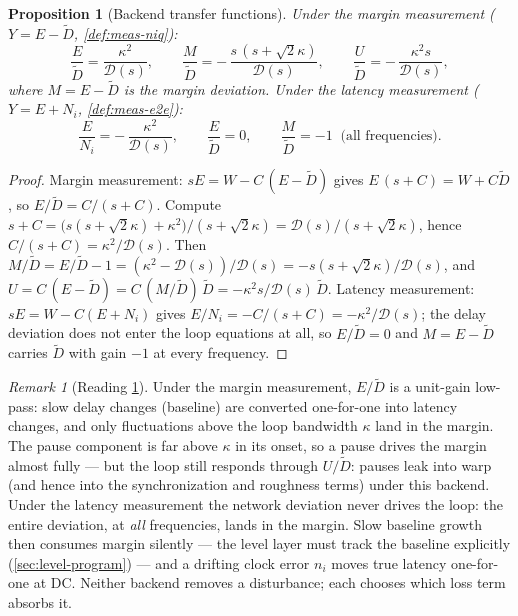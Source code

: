 \documentclass[11pt, a4paper]{article}
\theoremstyle{definition}
\theoremstyle{plain}
\newtheorem{proposition}[theorem]{Proposition}
\theoremstyle{remark}
\newtheorem{remark}{Remark}[section]
\begin{document}
\begin{proposition}[Backend transfer functions]\label{prop:transfer}
Under the margin measurement ($Y = E - \tilde D$, \cref{def:meas-niq}):
\begin{equation}\label{eq:tf-niq}
  \frac{E}{\tilde D} = \frac{\kappa^2}{\mathcal{D}(s)},
  \qquad
  \frac{M}{\tilde D} = -\,\frac{s\,(s+\sqrt2\kappa)}{\mathcal{D}(s)},
  \qquad
  \frac{U}{\tilde D} = -\,\frac{\kappa^2 s}{\mathcal{D}(s)},
\end{equation}
where $M = E - \tilde D$ is the margin deviation.  Under the latency
measurement ($Y = E + N_i$, \cref{def:meas-e2e}):
\begin{equation}\label{eq:tf-e2e}
  \frac{E}{N_i} = -\,\frac{\kappa^2}{\mathcal{D}(s)},
  \qquad
  \frac{E}{\tilde D} = 0,
  \qquad
  \frac{M}{\tilde D} = -1 \;\;\text{(all frequencies)} .
\end{equation}
\end{proposition}

\begin{proof}
Margin measurement: $sE = W - C\,(E - \tilde D)$ gives
$E\,(s + C) = W + C\tilde D$, so
$E/\tilde D = C/(s+C)$.  Compute
$s + C = \bigl(s(s+\sqrt2\kappa) + \kappa^2\bigr)/(s+\sqrt2\kappa)
= \mathcal{D}(s)/(s+\sqrt2\kappa)$, hence
$C/(s+C) = \kappa^2/\mathcal{D}(s)$.  Then
$M/\tilde D = E/\tilde D - 1 = (\kappa^2 - \mathcal{D}(s))/\mathcal{D}(s)
= -s(s+\sqrt2\kappa)/\mathcal{D}(s)$, and
$U = C\,(E - \tilde D) = C\,(M/\tilde D)\,\tilde D
= -\kappa^2 s/\mathcal{D}(s)\,\tilde D$.
Latency measurement: $sE = W - C(E + N_i)$ gives
$E/N_i = -C/(s+C) = -\kappa^2/\mathcal{D}(s)$; the delay deviation does not enter
the loop equations at all, so $E/\tilde D = 0$ and
$M = E - \tilde D$ carries $\tilde D$ with gain $-1$ at every
frequency.
\end{proof}

\begin{remark}[Reading \cref{prop:transfer}]\label{rem:transfer-reading}
Under the margin measurement, $E/\tilde D$ is a unit-gain low-pass:
slow delay changes (baseline) are converted one-for-one into latency
changes, and only fluctuations above the loop bandwidth $\kappa$ land in
the margin.  The pause component is far above $\kappa$ in its onset, so
a pause drives the margin almost fully --- but the loop still responds
through $U/\tilde D$: pauses leak into warp (and hence into the
synchronization and roughness terms) under this backend.
Under the latency measurement the network deviation never drives the
loop: the entire deviation, at \emph{all} frequencies, lands in the
margin.  Slow baseline growth then consumes margin silently --- the
level layer must track the baseline explicitly
(\cref{sec:level-program}) --- and a drifting clock error $n_i$ moves
true latency one-for-one at DC.  Neither backend removes a disturbance;
each chooses which loss term absorbs it.
\end{remark}
\end{document}
